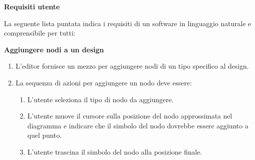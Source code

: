 \begin{esempio}
	\textbf{Requisiti utente}\par
	\noindent La seguente lista puntata indica i requisiti di un software in linguaggio naturale e comprensibile per tutti:\newline
	
	\textbf{Aggiungere nodi a un design} \begin{enumerate}
		\item L'editor fornisce un mezzo per aggiungere nodi di un tipo specifico al design.
		\item La sequenza di azioni per aggiungere un nodo deve essere: \begin{enumerate}
			\item L'utente seleziona il tipo di nodo da aggiungere.
			\item L'utente muove il cursore sulla posizione del nodo approssimata nel diagramma e indicare che il simbolo del nodo dovrebbe essere aggiunto a quel punto.
			\item L'utente trascina il simbolo del nodo alla posizione finale.
		\end{enumerate}
	\end{enumerate}
\end{esempio}

